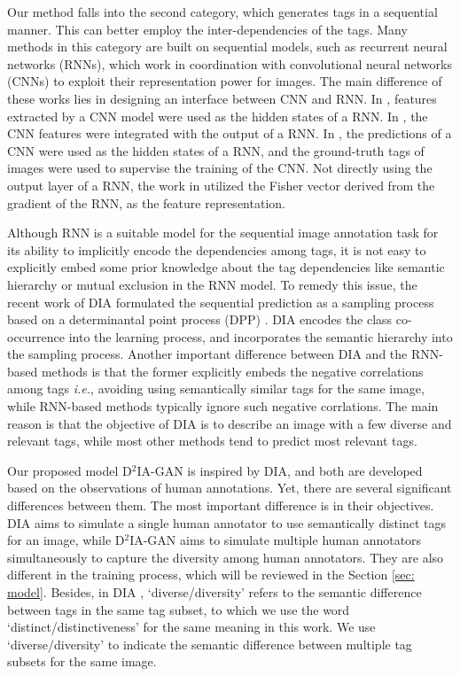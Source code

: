 \documentclass[10pt,twocolumn,letterpaper]{article}
\begin{document}
Our method falls into the second category, which generates tags in a sequential manner. This can better employ the inter-dependencies of the tags. 
Many methods in this category are built on sequential models, such as recurrent neural networks (RNNs), which work in coordination with convolutional neural networks (CNNs) to exploit their representation power for images. The main difference of these works lies in designing an interface between CNN and RNN.
In \cite{rnn-image-annotation-icpr-2016}, features extracted by a CNN model were used as the hidden states of a RNN. 
In \cite{rnn-cnn-image-annotation-cvpr-2016}, the CNN features were integrated with the output of a RNN. 
In \cite{rnn-semantic-regularization-cvpr-2017}, the predictions of a CNN were used as the hidden states of a RNN, and the ground-truth tags of images were used to supervise the training of the CNN. 
Not directly using the output layer of a RNN, the work in \cite{rnn-fisher-vector-eccv-2016} utilized the Fisher vector derived from the gradient of the RNN, as the feature representation.

Although RNN is a suitable model for the sequential image annotation
task for its ability to implicitly encode the dependencies
among tags, it is not easy to explicitly embed
some prior knowledge about the tag dependencies like semantic
hierarchy \cite{my-iccv-2015} or mutual exclusion \cite{xiaotong-multi-label-exclusive-2011} in the RNN model. 
%
To remedy this issue, the recent work of DIA \cite{my-cvpr-2017-dia} formulated the sequential prediction as a sampling process based on a determinantal point process (DPP) \cite{dpp-for-machine-learning-2012}. 
DIA encodes the class co-occurrence into the learning process, and incorporates the semantic hierarchy into the sampling process. 
Another important difference between
DIA and the RNN-based methods is that the former explicitly
embeds the negative correlations among tags {\it i.e.}, avoiding using semantically similar tags for the same image, while RNN-based methods typically ignore such negative corrlations.
%
The main reason is that the objective of DIA is
to describe an image with a few diverse and relevant tags,
while most other methods tend to predict most relevant tags.


Our proposed model D$^2$IA-GAN is inspired by DIA, and both are developed based on the observations of human annotations. Yet, there are several significant differences between them. 
The most important difference is in their objectives. 
DIA aims to simulate a single human annotator to use semantically distinct
tags for an image, while D$^2$IA-GAN aims to simulate multiple human annotators simultaneously to capture the diversity among human annotators. 
They are also different in the training process, which will be reviewed in the Section \ref{sec: model}. 
Besides, in DIA \cite{my-cvpr-2017-dia}, `diverse/diversity' refers to the semantic difference between tags in the same tag subset, to which we use the word `distinct/distinctiveness' for the same meaning in this work. We use `diverse/diversity' to indicate the semantic difference between multiple tag subsets for the same image. 
\end{document}
